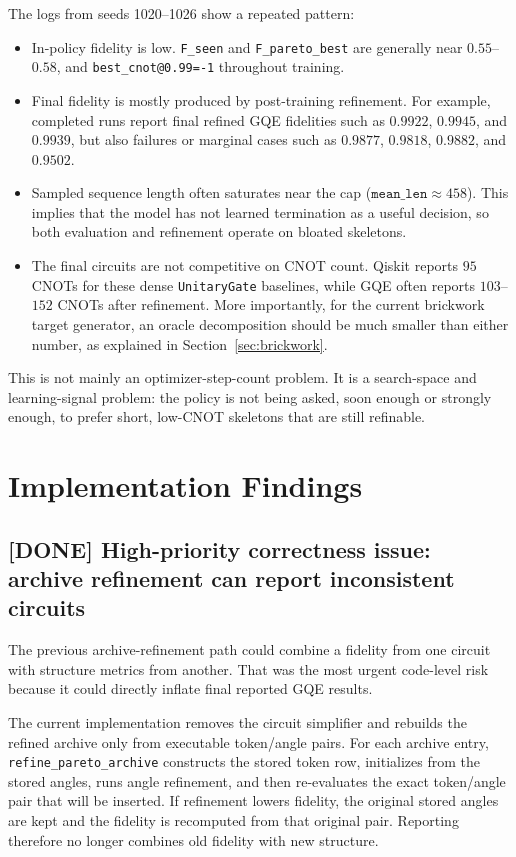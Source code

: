 \documentclass[11pt]{article}
\begin{document}
The logs from seeds 1020--1026 show a repeated pattern:
\begin{itemize}
  \item In-policy fidelity is low.  \texttt{F\_seen} and
  \texttt{F\_pareto\_best} are generally near \(0.55\)--\(0.58\), and
  \texttt{best\_cnot@0.99=-1} throughout training.
  \item Final fidelity is mostly produced by post-training refinement.  For
  example, completed runs report final refined GQE fidelities such as
  \(0.9922\), \(0.9945\), and \(0.9939\), but also failures or marginal cases
  such as \(0.9877\), \(0.9818\), \(0.9882\), and \(0.9502\).
  \item Sampled sequence length often saturates near the cap
  (\(\texttt{mean\_len}\approx 458\)).  This implies that the model has not
  learned termination as a useful decision, so both evaluation and refinement
  operate on bloated skeletons.
  \item The final circuits are not competitive on CNOT count.  Qiskit reports
  \(95\) CNOTs for these dense \texttt{UnitaryGate} baselines, while GQE often
  reports \(103\)--\(152\) CNOTs after refinement.  More importantly, for the
  current brickwork target generator, an oracle decomposition should be much
  smaller than either number, as explained in Section~\ref{sec:brickwork}.
\end{itemize}

This is not mainly an optimizer-step-count problem.  It is a search-space and
learning-signal problem: the policy is not being asked, soon enough or strongly
enough, to prefer short, low-CNOT skeletons that are still refinable.

\section{Implementation Findings}

\subsection{[DONE] High-priority correctness issue: archive refinement can report
inconsistent circuits}

The previous archive-refinement path could combine a fidelity from one circuit
with structure metrics from another.  That was the most urgent code-level risk
because it could directly inflate final reported GQE results.

The current implementation removes the circuit simplifier and rebuilds the
refined archive only from executable token/angle pairs.  For each archive entry,
\texttt{refine\_pareto\_archive} constructs the stored token row, initializes
from the stored angles, runs angle refinement, and then re-evaluates the exact
token/angle pair that will be inserted.  If refinement lowers fidelity, the
original stored angles are kept and the fidelity is recomputed from that
original pair.  Reporting therefore no longer combines old fidelity with new
structure.
\end{document}
